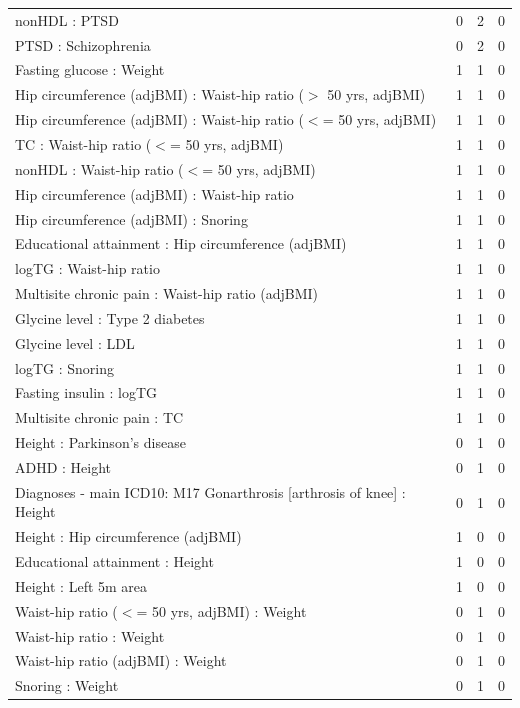 \begin{table}[ht]
\begin{tabular}{lrrr}
  nonHDL : PTSD &   0 &   2 &   0 \\ 
  PTSD : Schizophrenia &   0 &   2 &   0 \\ 
  Fasting glucose : Weight  &   1 &   1 &   0 \\ 
  Hip circumference (adjBMI) : Waist-hip ratio ($>$ 50 yrs, adjBMI) &   1 &   1 &   0 \\ 
  Hip circumference (adjBMI) : Waist-hip ratio ($<$= 50 yrs, adjBMI) &   1 &   1 &   0 \\ 
  TC : Waist-hip ratio ($<$= 50 yrs, adjBMI) &   1 &   1 &   0 \\ 
  nonHDL : Waist-hip ratio ($<$= 50 yrs, adjBMI) &   1 &   1 &   0 \\ 
  Hip circumference (adjBMI) : Waist-hip ratio  &   1 &   1 &   0 \\ 
  Hip circumference (adjBMI) : Snoring &   1 &   1 &   0 \\ 
  Educational attainment : Hip circumference (adjBMI) &   1 &   1 &   0 \\ 
  logTG : Waist-hip ratio  &   1 &   1 &   0 \\ 
  Multisite chronic pain : Waist-hip ratio (adjBMI) &   1 &   1 &   0 \\ 
  Glycine level  : Type 2 diabetes &   1 &   1 &   0 \\ 
  Glycine level  : LDL &   1 &   1 &   0 \\ 
  logTG : Snoring &   1 &   1 &   0 \\ 
  Fasting insulin : logTG &   1 &   1 &   0 \\ 
  Multisite chronic pain : TC &   1 &   1 &   0 \\ 
  Height  : Parkinson's disease &   0 &   1 &   0 \\ 
  ADHD : Height  &   0 &   1 &   0 \\ 
  Diagnoses - main ICD10: M17 Gonarthrosis [arthrosis of knee] : Height  &   0 &   1 &   0 \\ 
  Height  : Hip circumference (adjBMI) &   1 &   0 &   0 \\ 
  Educational attainment : Height  &   1 &   0 &   0 \\ 
  Height  : Left 5m area &   1 &   0 &   0 \\ 
  Waist-hip ratio ($<$= 50 yrs, adjBMI) : Weight  &   0 &   1 &   0 \\ 
  Waist-hip ratio  : Weight  &   0 &   1 &   0 \\ 
  Waist-hip ratio (adjBMI) : Weight  &   0 &   1 &   0 \\ 
  Snoring : Weight  &   0 &   1 &   0 \\ 

\end{tabular}
\end{table}
